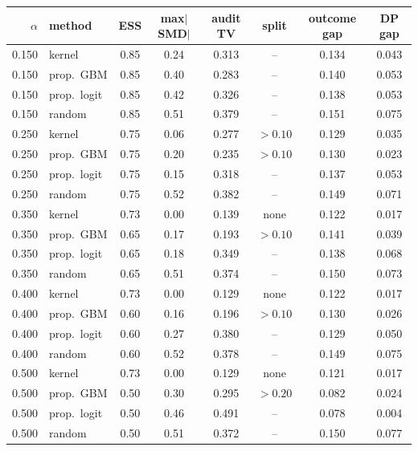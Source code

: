 \begin{tabular}{rlcccccc}
\toprule
$\alpha$ & method & ESS & max$|$SMD$|$ & audit TV & split & outcome gap & DP gap \\
\midrule
0.150 & kernel & 0.85 & 0.24 & 0.313 & -- & 0.134 & 0.043 \\
0.150 & prop.\ GBM & 0.85 & 0.40 & 0.283 & -- & 0.140 & 0.053 \\
0.150 & prop.\ logit & 0.85 & 0.42 & 0.326 & -- & 0.138 & 0.053 \\
0.150 & random & 0.85 & 0.51 & 0.379 & -- & 0.151 & 0.075 \\
\midrule
0.250 & kernel & 0.75 & 0.06 & 0.277 & $>0.10$ & 0.129 & 0.035 \\
0.250 & prop.\ GBM & 0.75 & 0.20 & 0.235 & $>0.10$ & 0.130 & 0.023 \\
0.250 & prop.\ logit & 0.75 & 0.15 & 0.318 & -- & 0.137 & 0.053 \\
0.250 & random & 0.75 & 0.52 & 0.382 & -- & 0.149 & 0.071 \\
\midrule
0.350 & kernel & 0.73 & 0.00 & 0.139 & none & 0.122 & 0.017 \\
0.350 & prop.\ GBM & 0.65 & 0.17 & 0.193 & $>0.10$ & 0.141 & 0.039 \\
0.350 & prop.\ logit & 0.65 & 0.18 & 0.349 & -- & 0.138 & 0.068 \\
0.350 & random & 0.65 & 0.51 & 0.374 & -- & 0.150 & 0.073 \\
\midrule
0.400 & kernel & 0.73 & 0.00 & 0.129 & none & 0.122 & 0.017 \\
0.400 & prop.\ GBM & 0.60 & 0.16 & 0.196 & $>0.10$ & 0.130 & 0.026 \\
0.400 & prop.\ logit & 0.60 & 0.27 & 0.380 & -- & 0.129 & 0.050 \\
0.400 & random & 0.60 & 0.52 & 0.378 & -- & 0.149 & 0.075 \\
\midrule
0.500 & kernel & 0.73 & 0.00 & 0.129 & none & 0.121 & 0.017 \\
0.500 & prop.\ GBM & 0.50 & 0.30 & 0.295 & $>0.20$ & 0.082 & 0.024 \\
0.500 & prop.\ logit & 0.50 & 0.46 & 0.491 & -- & 0.078 & 0.004 \\
0.500 & random & 0.50 & 0.51 & 0.372 & -- & 0.150 & 0.077 \\
\bottomrule
\end{tabular}
